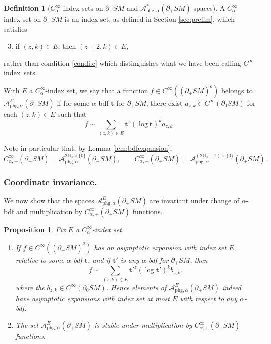 \documentclass[JEP,XML,SOM,Unicode,NoFloatCountersInSection, NoEqCountersInSection,published]{cedram}
\newenvironment{enumeratea}
{\bgroup\def\theenumi{\alph{enumi}}\begin{enumerate}}
{\end{enumerate}\egroup}
\theoremstyle{plain}
\newtheorem{Proposition}[Theorem]{Proposition}
\theoremstyle{definition}
\newtheorem{Definition}[Theorem]{Definition}
\theoremstyle{remark}
\def\Nm{{\mathbb{N}}}
\def\A{\mathcal{A}}
\newcommand{\bt}{{\boldsymbol{t}}}
\newcommand{\phg}{\mathrm{phg}}
\begin{document}
\begin{Definition}[$C_\alpha^\infty$-index sets on $\partial_+ SM$ and $\A^*_{\phg,\alpha}(\partial_+ SM)$ spaces]
A $C_\alpha^\infty$-index set on $\partial_+ SM$ is an index set, as defined in Section \ref{sec:prelim}, which satisfies
\begin{enumerate}\setcounter{enumi}{2}\renewcommand{\theenumi}{\alph{enumi}'}
\item\label{condi:c'}
if $(z,k)\in E$, then $(z+2,k)\in E$,
\end{enumerate}
rather than condition \eqref{condi:c} which distinguishes what we have been calling $C^\infty$ index~sets.

With $E$ a $C_\alpha^\infty$-index set, we say that a function $f\in C^\infty((\partial_{+}SM)^o)$ belongs to $\A_{\phg,\alpha}^E(\partial_+ SM)$ if for some $\alpha$-bdf $\bt$ for $\partial_+ SM$, there exist $a_{z,k}\in C^\infty (\partial_0 SM)$ for each $(z,k)\in E$ such that
\begin{equation*}
f \sim \sum_{(z,k)\in E} \bt^z (\log \bt)^k a_{z,k}.
\end{equation*}
\end{Definition}

Note in particular that, by Lemma \ref{lem:bdfexpansion},
\begin{equation*}
C^\infty_{\alpha,+} (\partial_+ SM) = \A_{\phg,\alpha}^{2\Nm_0\times \{0\}} (\partial_+ SM), \qquad C^\infty_{\alpha,-} (\partial_+ SM) = \A_{\phg,\alpha}^{(2\Nm_0+1)\times \{0\}} (\partial_+ SM).
\end{equation*}

\subsubsection*{Coordinate invariance.}
We now show that the spaces $\A_{\phg,\alpha}^E (\partial_+ SM)$ are invariant under change of $\alpha$-bdf and multiplication by $C_{\alpha,+}^\infty (\partial_+ SM)$ functions.

\begin{Proposition} Fix $E$ a $C^\infty_\alpha$-index set.
\begin{enumeratea}
\item
If $f\in C^\infty((\partial_+ SM)^o)$ has an asymptotic expansion with index set $E$ relative to some $\alpha$-bdf $\bt$, and if $\bt'$ is \emph{any} $\alpha$-bdf for $\partial_+ SM$, then\vspace*{-3pt}
\begin{equation*}
f \sim \sum_{(z,k)\in E} \bt'^z (\log \bt')^k b_{z,k}.
\end{equation*}
where the $b_{z,k} \in C^\infty(\partial_0 SM)$. Hence elements of $\A_{\phg,\alpha}^E(\partial_+ SM)$ indeed have asymptotic expansions with index set at most $E$ with respect to {\em any} $\alpha$-bdf.

\item
The set $\A_{\phg,\alpha}^E(\partial_+ SM)$ is stable under multiplication by $C_{\alpha,+}^\infty(\partial_+ SM)$ functions.
\end{enumeratea}
\end{Proposition}
\end{document}
